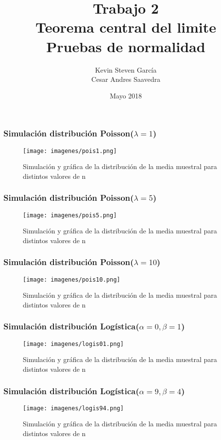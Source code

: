 \documentclass[12pt]{beamer}
\author{Kevin Steven García \\ Cesar Andres Saavedra}
\title{Trabajo 2 \\ Teorema central del limite \\ Pruebas de normalidad}
\institute{Universidad del Valle \\ Estadística \\ Simulación Estadística}
\date{Mayo 2018}
\begin{document}
\begin{frame}
\titlepage
\end{frame}




\begin{frame}
\frametitle{Simulación distribución Poisson($\lambda=1$) }
\begin{figure}
\centering
\texttt{[image: imagenes/pois1.png]}
\caption{Simulación y gráfica de la distribución de la media muestral para distintos valores de n}\label{figura2}
\end{figure}
\end{frame}

\begin{frame}
\frametitle{Simulación distribución Poisson($\lambda=5$) }
\begin{figure}
\centering
\texttt{[image: imagenes/pois5.png]}
\caption{Simulación y gráfica de la distribución de la media muestral para distintos valores de n}\label{figura2}
\end{figure}
\end{frame}

\begin{frame}
\frametitle{Simulación distribución Poisson($\lambda=10$) }
\begin{figure}
\centering
\texttt{[image: imagenes/pois10.png]}
\caption{Simulación y gráfica de la distribución de la media muestral para distintos valores de n}\label{figura2}
\end{figure}
\end{frame}

\begin{frame}
\frametitle{Simulación distribución Logística($\alpha=0,\beta=1$) }
\begin{figure}
\centering
\texttt{[image: imagenes/logis01.png]}
\caption{Simulación y gráfica de la distribución de la media muestral para distintos valores de n}\label{figura2}
\end{figure}
\end{frame}

\begin{frame}
\frametitle{Simulación distribución Logística($\alpha=9,\beta=4$) }
\begin{figure}
\centering
\texttt{[image: imagenes/logis94.png]}
\caption{Simulación y gráfica de la distribución de la media muestral para distintos valores de n}\label{figura2}
\end{figure}
\end{frame}
\end{document}
